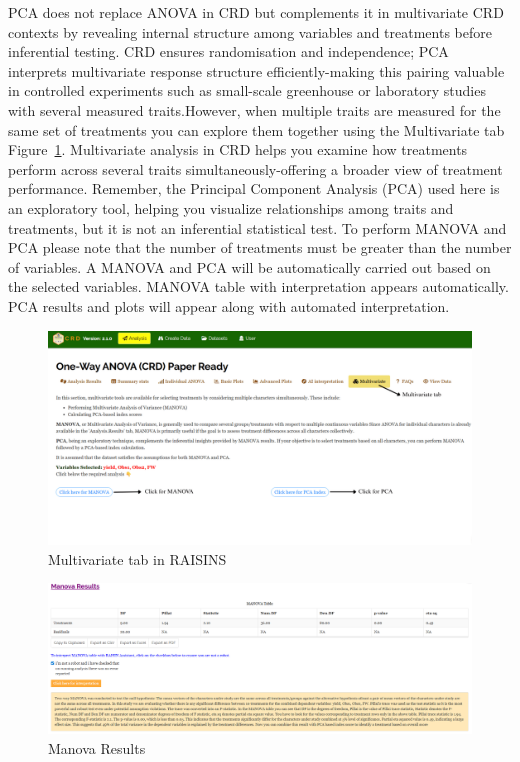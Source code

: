 \documentclass[
  letterpaper,
  DIV=11,
  numbers=noendperiod]{scrartcl}
\begin{document}
PCA does not replace ANOVA in CRD but complements it in multivariate CRD
contexts by revealing internal structure among variables and treatments
before inferential testing. CRD ensures randomisation and independence;
PCA interprets multivariate response structure efficiently-making this
pairing valuable in controlled experiments such as small-scale
greenhouse or laboratory studies with several measured traits.However,
when multiple traits are measured for the same set of treatments you can
explore them together using the Multivariate tab Figure~\ref{fig-mu}.
Multivariate analysis in CRD helps you examine how treatments perform
across several traits simultaneously-offering a broader view of
treatment performance. Remember, the Principal Component Analysis (PCA)
used here is an exploratory tool, helping you visualize relationships
among traits and treatments, but it is not an inferential statistical
test. To perform MANOVA and PCA please note that the number of
treatments must be greater than the number of variables. A MANOVA and
PCA will be automatically carried out based on the selected variables.
MANOVA table with interpretation appears automatically. PCA results and
plots will appear along with automated interpretation.

\begin{figure}

{\centering \includegraphics{MUTITAB.webp}

}

\caption{\label{fig-mu}Multivariate tab in RAISINS}

\end{figure}

\begin{figure}

{\centering \includegraphics{MAN2.webp}

}

\caption{\label{fig-MAN2}Manova Results}

\end{figure}
\end{document}
